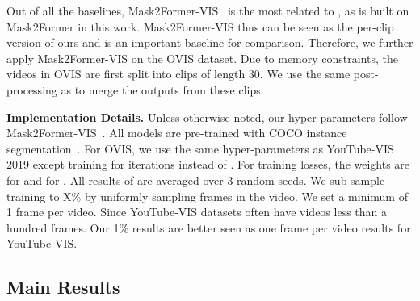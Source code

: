 Out of all the baselines,  Mask2Former-VIS~\cite{cheng2021mask2former} is the most related to \ours, as \ours is built on Mask2Former in this work. Mask2Former-VIS thus can be seen as the per-clip version of ours and is an important baseline for comparison. Therefore, we further apply Mask2Former-VIS on the OVIS dataset. Due to memory constraints, the videos in OVIS are first split into clips of length 30. We use the same post-processing as \ours to merge the outputs from these clips.

\noindent\textbf{Implementation Details.} 
Unless otherwise noted, our hyper-parameters follow Mask2Former-VIS~\cite{cheng2021mask2former}. All models are pre-trained with COCO instance segmentation~\cite{lin2014microsoft}. For OVIS, we use the same hyper-parameters as YouTube-VIS 2019 except training for  iterations instead of . For training losses, the weights are  for  and  for . All results of \ours are averaged over 3 random seeds. We sub-sample training to X\% by uniformly sampling frames in the video. We set a minimum of 1 frame per video. Since YouTube-VIS datasets often have videos less than a hundred frames. Our 1\% results are better seen as one frame per video results for YouTube-VIS.

\subsection{Main Results}

